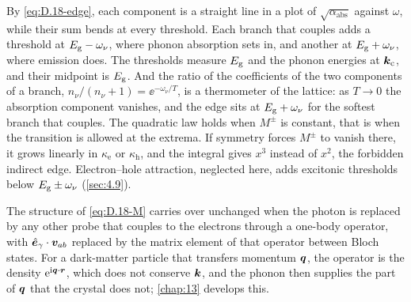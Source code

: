 By \cref{eq:D.18-edge}, each component is a straight line in a plot of $\sqrt{\alpha_{\mathrm{abs}}}$ against $\omega$, while their sum bends at every threshold. Each branch that couples adds a threshold at $E_{\mathrm{g}} - \omega_\nu$, where phonon absorption sets in, and another at $E_{\mathrm{g}} + \omega_\nu$, where emission does. The thresholds measure $E_{\mathrm{g}}$ and the phonon energies at $\bm{k}_{\mathrm{c}}$, and their midpoint is $E_{\mathrm{g}}$. And the ratio of the coefficients of the two components of a branch, $n_\nu/(n_\nu + 1) = \ee^{-\omega_\nu/T}$, is a thermometer of the lattice: as $T \to 0$ the absorption component vanishes, and the edge sits at $E_{\mathrm{g}} + \omega_\nu$ for the softest branch that couples. The quadratic law holds when $M^\pm$ is constant, that is when the transition is allowed at the extrema. If symmetry forces $M^\pm$ to vanish there, it grows linearly in $\kappa_{\mathrm{e}}$ or $\kappa_{\mathrm{h}}$, and the integral gives $x^3$ instead of $x^2$, the forbidden indirect edge. Electron--hole attraction, neglected here, adds excitonic thresholds below $E_{\mathrm{g}} \pm \omega_\nu$ (\cref{sec:4.9}).

The structure of \cref{eq:D.18-M} carries over unchanged when the photon is replaced by any other probe that couples to the electrons through a one-body operator, with $\hat{\bm{e}}_\gamma\cdot\bm{v}_{ab}$ replaced by the matrix element of that operator between Bloch states. For a dark-matter particle that transfers momentum $\bm{q}$, the operator is the density $\mathrm{e}^{\mathrm{i}\bm{q}\cdot\bm{r}}$, which does not conserve $\bm{k}$, and the phonon then supplies the part of $\bm{q}$ that the crystal does not; \cref{chap:13} develops this.
